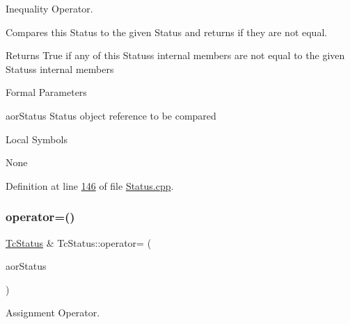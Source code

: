 Inequality Operator. 

Compares this Status to the given Status and returns if they are not equal.

\begin{DoxyReturn}{Returns}
True if any of this Status\textquotesingle{}s internal members are not equal to the given Status\textquotesingle{}s internal members
\end{DoxyReturn}
\begin{DoxyParagraph}{Formal Parameters}

\begin{DoxyPre}{\ttfamily [ in ]  aorStatus    Status object reference to be compared }\end{DoxyPre}

\end{DoxyParagraph}
\begin{DoxyParagraph}{Local Symbols}

\begin{DoxyPre}{\ttfamily  None }\end{DoxyPre}
 
\end{DoxyParagraph}


Definition at line \mbox{\hyperlink{_status_8cpp_source_l00146}{146}} of file \mbox{\hyperlink{_status_8cpp_source}{Status.\+cpp}}.

\mbox{\label{class_g_n_common_1_1_n_notification_1_1_tc_status_a97c8135ccc33bc5ba9d33f79de4ea789}} 
\subsubsection{\texorpdfstring{operator=()}{operator=()}}
{\footnotesize\ttfamily \mbox{\hyperlink{class_g_n_common_1_1_n_notification_1_1_tc_status}{Tc\+Status}} \& Tc\+Status\+::operator= (\begin{DoxyParamCaption}\item[{const \mbox{\hyperlink{class_g_n_common_1_1_n_notification_1_1_tc_status}{Tc\+Status}} \&}]{aor\+Status }\end{DoxyParamCaption})}



Assignment Operator. 

